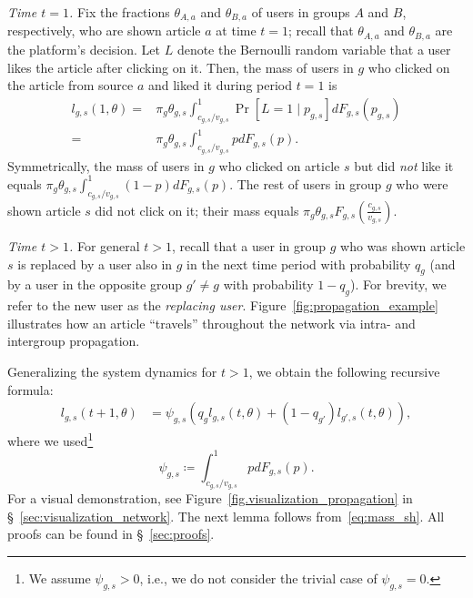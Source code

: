 \documentclass[letterpaper]{article} %
\begin{document}
\emph{Time ${t=1}$.}
Fix the fractions $\theta_{A,a}$ and $\theta_{B,a}$ of users in groups $A$ and $B$, respectively, who are shown article $a$ at time $t=1$; recall that $\theta_{A,a}$ and $\theta_{B,a}$ are the platform's decision.
Let $L$ denote the Bernoulli random variable that a user likes the article after clicking on it.
Then, the mass of users in $g$ who clicked on the article from source $a$ and liked it during period $t=1$ is
\footnotesize
\begin{align*}
        l_{g,s}(1, \theta)%
        =&\pi_g \theta_{g,s} \int_{c_{g,s}/v_{g,s}}^1 \Pr[L=1 \mid p_{g,s}] d F_{g,s} (p_{g,s}) \\
        =& \pi_g \theta_{g,s} \int_{c_{g,s}/v_{g,s}}^1 p d F_{g,s}(p).
\end{align*}
\normalsize
Symmetrically, the mass of users in $g$ who clicked on  article $s$ but did \emph{not} like it equals $\pi_g \theta_{g,s} \int_{c_{g,s}/v_{g,s}}^1 (1-p) d F_{g,s}(p)$.
The rest of  users  in group $g$ who were shown article $s$ did not click on it; their mass equals $\pi_g \theta_{g,s} F_{g,s}\left(\frac{c_{g,s}}{v_{g,s}}\right)$.

\emph{Time $t>1$.}
For general $t>1$, recall that a user in group $g$ who was shown article $s$ is replaced by a user also in $g$ in the next time period with probability $q_g$ (and by a user in the opposite group $g' \neq g$ with probability $1-q_g$).
For brevity, we refer to the new user as the \textit{replacing user}.
Figure~\ref{fig:propagation_example} illustrates how an article ``travels'' throughout the network via intra- and intergroup propagation.

Generalizing the system dynamics for $t>1$, we obtain the following recursive formula:
\footnotesize
\begin{equation}
\label{eq:mass_sh}
\begin{split}
    l_{g, s}(t+1,\theta) %
    &= \psi_{g,s}(q_g l_{g,s}(t,\theta) + (1-q_{g'}) l_{g', s}(t,\theta)),
\end{split}
\end{equation}
\normalsize
where we used\footnote{We assume $\psi_{g,s} > 0$, i.e., we do not consider the trivial case of $\psi_{g,s} = 0$.}
\[
    \psi_{g,s} \coloneqq \int_{c_{g,s}/v_{g,s}}^1 p d F_{g,s}(p).
\]
For a visual demonstration, see Figure~\ref{fig.visualization_propagation} in \S~\ref{sec:visualization_network}.
The next lemma follows from~\eqref{eq:mass_sh}.
All proofs can be found in \S~\ref{sec:proofs}.
\end{document}
